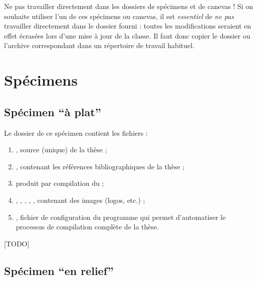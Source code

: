 \begin{dbwarning}{Ne pas travailler directement dans les dossiers de
    spécimens et de canevas !}{}
  Si on souhaite utiliser l'un de ces spécimens ou canevas, il est
  \emph{essentiel} de \emph{ne pas} travailler directement dans le dossier
  fourni : toutes les modifications seraient en effet écrasées lors d'une mise
  à jour de la classe. Il faut donc copier le dossier ou l'archive 
  correspondant dans un répertoire de travail habituel.
\end{dbwarning}


\section{Spécimens}
\label{sec:specimens}

\subsection{Spécimen \enquote{à plat}}
\label{sec:specimen-a-plat}

Le dossier  de ce spécimen contient les
fichiers :
\begin{enumerate}
\item {}, source  (unique) de la thèse  ;
\item {}, contenant les références bibliographiques de
  la thèse ;
\item {} produit par compilation du  ;
\item {}, , , ,
  , contenant des images (logos, etc.) ;
\item {}, fichier de configuration du programme 
  qui permet d'automatiser le processus de compilation complète de la thèse.
\end{enumerate}

[TODO]

\subsection{Spécimen \enquote{en relief}}
\label{sec:specimen-relief}

